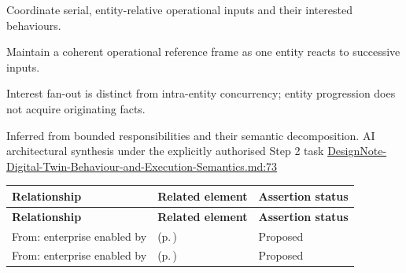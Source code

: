 
Coordinate serial, entity-relative operational inputs and their interested behaviours.



Maintain a coherent operational reference frame as one entity reacts to successive inputs.



Interest fan-out is distinct from intra-entity concurrency; entity progression does not acquire originating facts.


Inferred from bounded responsibilities and their semantic decomposition. AI architectural synthesis under the explicitly authorised Step 2 task \hyperref[evidence:ec6250f7cf7c29a5]{DesignNote-Digital-Twin-Behaviour-and-Execution-Semantics.md:73}
\begingroup\small\setlength{\TableWidth}{\dimexpr\linewidth-6\tabcolsep-4\arrayrulewidth\relax}
\begin{longtable}{|>{\raggedright\arraybackslash}p{0.27\TableWidth}|>{\raggedright\arraybackslash}p{0.48\TableWidth}|>{\raggedright\arraybackslash}p{0.25\TableWidth}|}
\hline\rowcolor{TableHead}\textbf{Relationship} & \textbf{Related element} & \textbf{Assertion status}\\\hline\endfirsthead
\hline\rowcolor{TableHead}\textbf{Relationship} & \textbf{Related element} & \textbf{Assertion status}\\\hline\endhead
\hline\endfoot
From: enterprise enabled by & \nameref{cap:bec-discharge-management} (p.\,\pageref{cap:bec-discharge-management}) & Proposed\\\hline
From: enterprise enabled by & \nameref{cap:bec-bed-care-place-management} (p.\,\pageref{cap:bec-bed-care-place-management}) & Proposed\\\hline
\end{longtable}\endgroup

